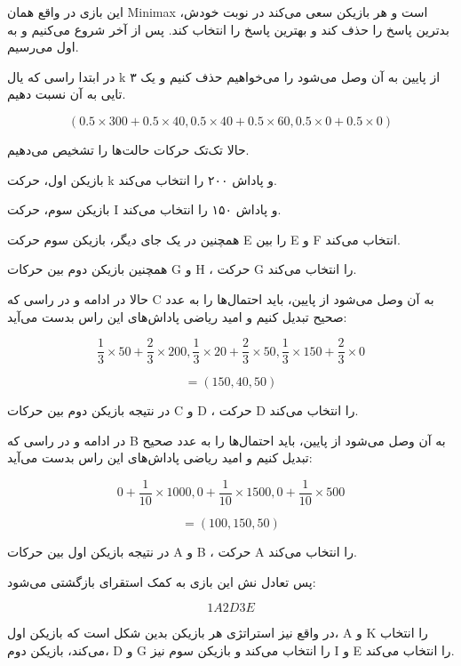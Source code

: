 این بازی در واقع همان Minimax است و هر بازیکن سعی می‌کند در نوبت خودش، بدترین پاسخ را حذف کند و بهترین پاسخ را انتخاب کند. پس از آخر شروع می‌کنیم و به اول می‌رسیم.


در ابتدا راسی که یال k از پایین به آن وصل می‌شود را می‌خواهیم حذف کنیم و یک ۳ تایی به آن نسبت دهیم.

$$
(0.5 \times 300 + 0.5 \times 40 , 0.5 \times 40 + 0.5 \times 60 , 0.5 \times 0 + 0.5 \times 0)
$$

حالا تک‌تک حرکات حالت‌ها را تشخیص می‌دهیم.


بازیکن اول، حرکت k و پاداش ۲۰۰ را انتخاب می‌کند.


بازیکن سوم، حرکت I و پاداش ۱۵۰ را انتخاب می‌کند.


همچنین در یک جای دیگر، بازیکن سوم حرکت E را بین E و F انتخاب می‌کند.


همچنین بازیکن دوم بین حرکات G و H ، حرکت G را انتخاب می‌کند.


حالا در ادامه و در راسی که C به آن وصل می‌شود از پایین، باید احتمال‌ها را به عدد صحیح تبدیل کنیم و امید ریاضی پاداش‌های این راس بدست می‌آید:

$$
\frac{1}{3} \times 50 + \frac{2}{3} \times 200 , \frac{1}{3} \times 20 + \frac{2}{3} \times 50 , \frac{1}{3} \times 150 + \frac{2}{3} \times 0
$$

$$
= (150, 40, 50)
$$

در نتیجه بازیکن دوم بین حرکات C و D ، حرکت D را انتخاب می‌کند.


در ادامه و در راسی که B به آن وصل می‌شود از پایین، باید احتمال‌ها را به عدد صحیح تبدیل کنیم و امید ریاضی پاداش‌های این راس بدست می‌آید:

$$
0 + \frac{1}{10} \times 1000 , 0 + \frac{1}{10} \times 1500 , 0 + \frac{1}{10} \times 500
$$

$$
= (100, 150, 50)
$$

در نتیجه بازیکن اول بین حرکات A و B ، حرکت A را انتخاب می‌کند.

پس تعادل نش این بازی به کمک استقرای بازگشتی می‌شود:

$$
1A2D3E
$$

در واقع نیز استراتژی هر بازیکن بدین شکل است که بازیکن اول، A و K را انتخاب می‌کند، بازیکن دوم، D و G را انتخاب می‌کند و بازیکن سوم نیز I و E را انتخاب می‌کند.



